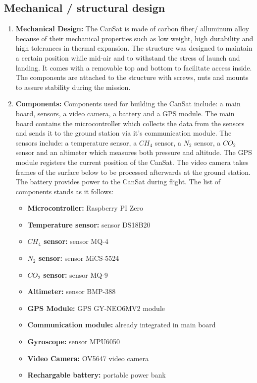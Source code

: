 \documentclass[11pt]{article}
\begin{document}
\subsection{Mechanical / structural design}
\begin{enumerate}
\item \textbf{Mechanical Design:} The CanSat is made of carbon fiber/ alluminum alloy because of their mechanical properties such as low weight, high durability and high tolerances in thermal expansion. The structure was designed to maintain a certain position while mid-air and to withstand the stress of launch and landing. It comes with a removable top and bottom to facilitate access inside. The components are attached to the structure with screws, nuts and mounts to assure stability during the mission.
\vspace{0.25cm}
\item \textbf{Components:} Components used for building the CanSat include: a main board, sensors, a video camera, a battery and a GPS module. The main board contains the microcontroller which collects the data from the sensors and sends it to the ground station via it’s communication module. The sensors include: a temperature sensor, a $CH_4$ sensor, a $N_2$ sensor, a $CO_2$ sensor and an altimeter which measures both pressure and altitude. The GPS module registers the current position of the CanSat. The video camera takes frames of the surface below to be processed afterwards at the ground station. The battery provides power to the CanSat during flight. The list of components stands as it follows:

\begin{itemize}
\item \textbf{Microcontroller:} Raspberry PI Zero
\item \textbf{Temperature sensor:} sensor DS18B20
\item \textbf{$CH_4$ sensor:} sensor MQ-4
\item \textbf{$N_2$ sensor:} sensor MiCS-5524
\item \textbf{$CO_2$ sensor:} sensor MQ-9
\item \textbf{Altimeter:} sensor BMP-388
\item \textbf{GPS Module:} GPS GY-NEO6MV2 module
\item \textbf{Communication module:} already integrated in main board
\item \textbf{Gyroscope:} sensor MPU6050
\item \textbf{Video Camera:} OV5647 video camera
\item \textbf{Rechargable battery:} portable power bank
\end{itemize}


\end{enumerate}
\end{document}
